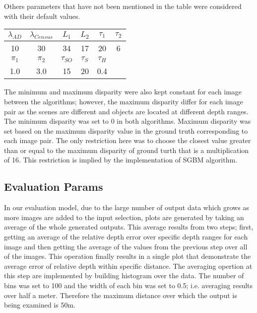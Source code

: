 Others parameters that have not been mentioned in the table were considered with their default values. \newline

\begin{minipage}{0.8\linewidth}
\begin{center}
\label{tab:adcparams}
\begin{tabular}{|c|c|c|c|c|c|}
\hline
$\lambda_{AD}$ & $\lambda_{Census}$ & $L_{1}$ & $L_{2}$ & $\tau_{1}$ & $\tau_{2}$ \\  \hline
10 & 30 & 34 & 17 & 20 & 6  \\ \hline
$\pi_{1}$ & $\pi_{2}$ & $\tau_{SO}$ & $\tau_{S}$ & $\tau_{H}$ & \\  \hline
1.0 & 3.0 & 15 & 20 & 0.4 &  \\ \hline
\end{tabular}
\end{center}
\end{minipage} \newline

The minimum and maximum disparity were also kept constant for each image between the algorithms; however, the maximum disparity differ for each image pair as the scenes are different
and objects are located at different depth ranges.
The minimum disparity was set to $0$ in both algorithms. Maximum disparity was set based on the maximum disparity value in the ground truth corresponding to each
image pair. The only restriction here was to choose the closest value greater than or equal to the maximum disparity of ground turth that is a multiplication of 16. This restriction
is implied by the implementation of SGBM algorithm.

\subsection{Evaluation Params}
In our evaluation model, due to the large number of output data which grows as more images are added to the input selection, 
plots are generated by taking an average of the whole generated outputs. This average results from two steps; first, getting an average of the relative depth error over specific
depth ranges for each image and then getting the average of the values from the previous step over all of the images. This operation finally results in a single plot
that demonstrate the average error of relative depth within specific distance.
The averaging opertion at this step are implemented by building histogram over the data. The number of bins was set to 100 and the width of each bin was set to 0.5; 
i.e. averaging results over half a meter. Therefore the maximum distance over which the output is being examined is 50m.

